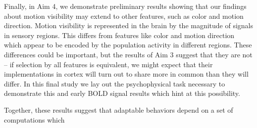 Finally, in Aim 4, we demonstrate preliminary results showing that our findings about motion visibility may extend to other features, such as color and motion direction. Motion visibility is represented in the brain by the magnitude of signals in sensory regions. This differs from features like color and motion direction which appear to be encoded by the population activity in different regions. These differences could be important, but the results of Aim 3 suggest that they are not -- if selection by all features is equivalent, we might expect that their implementations in cortex will turn out to share more in common than they will differ. In this final study we lay out the psychophysical task necessary to demonstrate this and early BOLD signal results which hint at this possibility. 

Together, these results suggest that adaptable behaviors depend on a set of computations which 